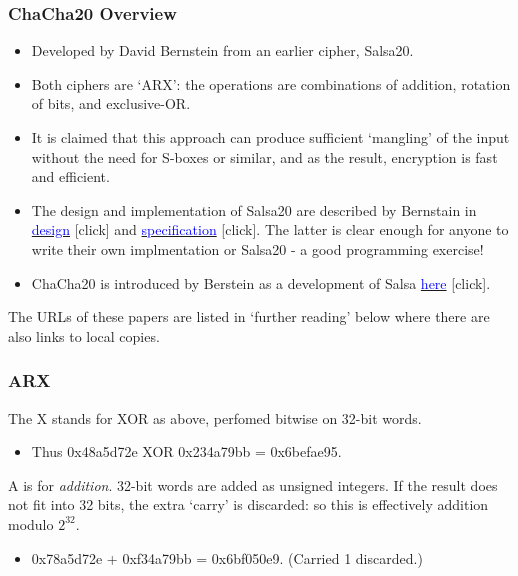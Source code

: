 \documentclass[10pt, hyperref={pdfpagelabels=false}]{beamer}
\begin{document}
\begin{frame}
\frametitle{ChaCha20 Overview}
\begin{itemize}
\item Developed by David Bernstein from an earlier cipher, Salsa20.
\item Both ciphers are `ARX': the operations are combinations of addition, rotation of bits, and exclusive-OR.
\item It is claimed that this approach can produce sufficient `mangling' of the input without the need for S-boxes or similar, and as the result, encryption is fast and efficient.
\item The design and implementation of Salsa20 are described by Bernstain in \href{https://cr.yp.to/snuffle/design.pdf}{\textcolor{blue}{design}} [click] and \href{https://cr.yp.to/snuffle/spec.pdf}{\textcolor{blue}{specification}} [click]. The latter is clear enough for anyone to write their own implmentation or Salsa20 - a good programming exercise!
\item ChaCha20 is introduced by Berstein as a development of Salsa \href{https://cr.yp.to/chacha/chacha-20080128.pdf}{\textcolor{blue}{here}} [click]. 
\end{itemize}

The URLs of these papers are listed in `further reading' below where there are also links to local copies. 
\end{frame} 

\begin{frame}
\frametitle{ARX}
The X stands for XOR as above, perfomed bitwise on 32-bit words.
\begin{itemize}
\item Thus 0x48a5d72e XOR 0x234a79bb = 0x6befae95.
\end{itemize}

A is for \emph{addition}. 32-bit words are added as unsigned integers. If the result does not fit into 32 bits, the extra `carry' is discarded: so this is effectively addition modulo $2^{32}$.
\begin{itemize}
\item 0x78a5d72e + 0xf34a79bb = 0x6bf050e9. (Carried 1 discarded.)
\end{itemize}
\end{frame} 
\end{document}
